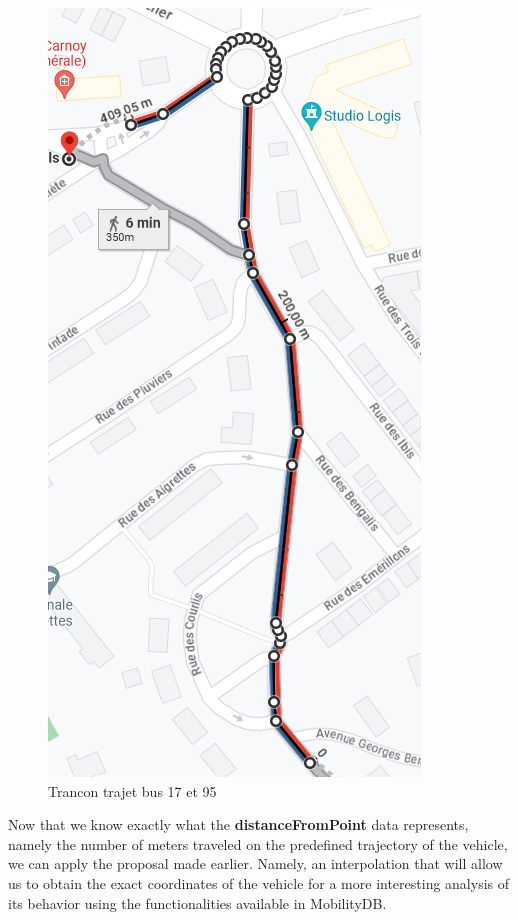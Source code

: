 \documentclass[12pt]{report}
\begin{document}
	\begin{center}
		\begin{figure}
			\centering
			\includegraphics{images/tranconsBus17-3Till-Miraval.png}
			\caption{Trancon trajet bus 17 et 95}
			\label{trancon17distance}
		\end{figure}
	\end{center}
	
	\vspace{-2cm}
	
	Now that we know exactly what the \textbf{distanceFromPoint} data represents, namely the number of meters traveled on the predefined trajectory of the vehicle, we can apply the proposal made earlier. Namely, an interpolation that will allow us to obtain the exact coordinates of the vehicle for a more interesting analysis of its behavior using the functionalities available in MobilityDB.
	
\end{document}
